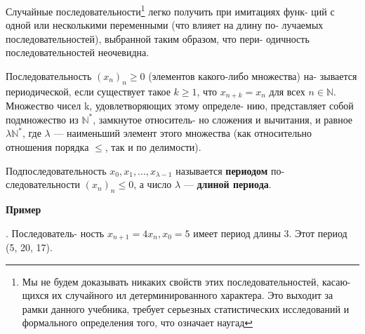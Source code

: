 \noindent Случайные последовательности\footnote{Мы не будем доказывать никаких свойств этих последовательностей, касаю- \linebreak щихся их случайного ил детерминированного характера. Это выходит за рамки \linebreak данного учебника, требует серьезных статистических исследований и формального \linebreak определения того, что означает \guillemotleft наугад\guillemotright \;} легко получить при имитациях функ- \linebreak ций с одной или несколькими переменными (что влияет на длину по- \linebreak лучаемых последовательностей), выбранной таким образом, что пери- \linebreak одичность последовательностей неочевидна.

\begin{determ}
Последовательность $(x_{n})_{n}\geqslant 0$ (элементов какого-либо множества) на- \linebreak зывается периодической, если существует такое $k\geqslant 1$, что $x_{n+k} = x_{n}$ \linebreak для всех $n \in \mathbb{N}.$ Множество чисел k, удовлетворяющих этому определе- \linebreak нию, представляет собой подмножество из $\mathbb{N}^{*}$, замкнутое относитель- \linebreak но сложения и вычитания, и равное $\lambda \mathbb{N}^{*}$, где $\lambda$ --- наименьший элемент
 \newpage 
\noindent этого множества (как относительно отношения порядка $\leqslant$, так и по \linebreak делимости). \par 
Подпоследовательность $x_{0}, x_{1},..., x_{\lambda - 1}$ называется \textbf{периодом} по- \linebreak следовательности $(x_{n})_{n} \leqslant 0$, а число $\lambda$ --- \textbf{длиной периода}.
\end{determ}
\noindent\textbf{Пример} \par
{}. Последователь- \linebreak ность $x_{n+1} = 4x_{n}, x_{0} = 5$ имеет период длины 3. Этот период \linebreak (5, 20, 17).


